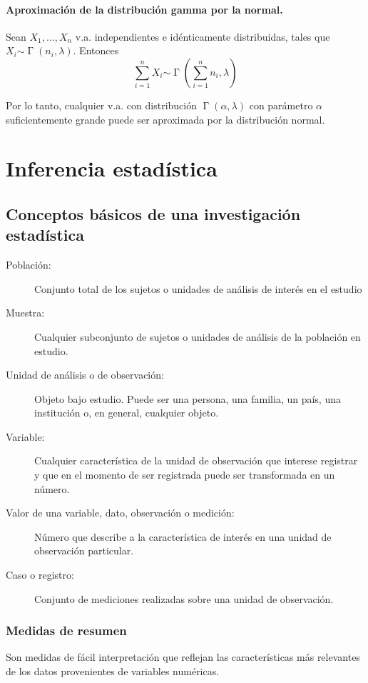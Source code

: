 \documentclass[11pt]{article}
\theoremstyle{plain}
\theoremstyle{definition}
\theoremstyle{remark}
\newcommand{\dists}[1]{\ensuremath{\operatorname{#1}}}  %
\newcommand{\dist}[1]{\ensuremath{\sim \operatorname{#1}}}  %
\begin{document}
      \paragraph{Aproximación de la distribución gamma por la normal.}
      Sean $X_1, \dots, X_n$ v.a. independientes e idénticamente distribuidas, tales que $X_i \dist{\Gamma}(n_i,\lambda)$. Entonces
      \[ \sum_{i=1}^n X_i \dist{\Gamma}\left(\sum_{i=1}^n n_i,\lambda \right) \]

      Por lo tanto, cualquier v.a. con distribución $\dists{\Gamma}(\alpha,\lambda)$ con parámetro $\alpha$suficientemente grande puede ser aproximada por la distribución normal.

\section{Inferencia estadística}

  \subsection{Conceptos básicos de una investigación estadística}

    \begin{description}
      \item[Población:] Conjunto total de los sujetos o unidades de análisis de interés en el estudio
      \item[Muestra:] Cualquier subconjunto de sujetos o unidades de análisis de la población en estudio.
      \item[Unidad de análisis o de observación:] Objeto bajo estudio. Puede ser una persona, una familia, un país, una institución o, en general, cualquier objeto.
      \item[Variable:] Cualquier característica de la unidad de observación que interese registrar y que en el momento de ser registrada puede ser transformada en un número.
      \item[Valor de una variable, dato, observación o medición:] Número que describe a la característica de interés en una unidad de observación particular.
      \item[Caso o registro:] Conjunto de mediciones realizadas sobre una unidad de observación.
    \end{description}

    \subsubsection{Medidas de resumen}
      Son medidas de fácil interpretación que reflejan las características más relevantes de los datos provenientes de variables numéricas.
\end{document}
